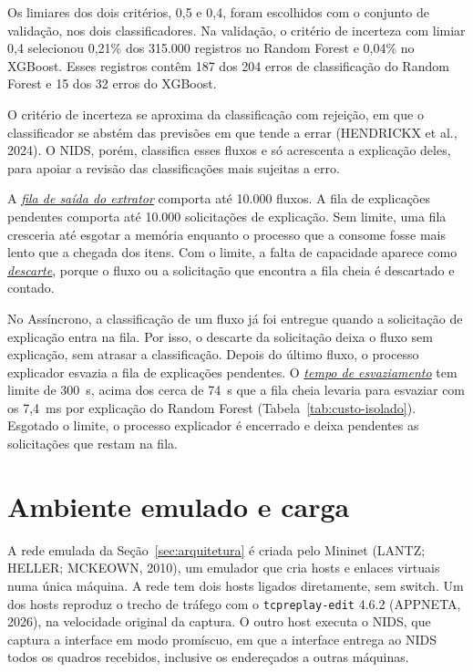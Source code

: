 \documentclass[
  12pt,
  oneside,
  a4paper,
  chapter=TITLE,
  sumario=tradicional,
  english,
  brazil
]{abntex2}
\newcommand{\termo}[2]{\hyperref[gl:#1]{\emph{#2}}}
\begin{document}
Os limiares dos dois critérios, 0,5 e 0,4, foram escolhidos com o conjunto de validação, nos dois
classificadores. Na validação, o critério de incerteza com limiar 0,4 selecionou 0,21\% dos 315.000
registros no Random Forest e 0,04\% no XGBoost. Esses registros contêm 187 dos 204 erros de
classificação do Random Forest e 15 dos 32 erros do XGBoost.

O critério de incerteza se aproxima da classificação com rejeição, em que o classificador se abstém
das previsões em que tende a errar (HENDRICKX et al., 2024). O NIDS, porém, classifica esses fluxos
e só acrescenta a explicação deles, para apoiar a revisão das classificações mais sujeitas a erro.

A \termo{fila-extrator}{fila de saída do extrator} comporta até 10.000 fluxos. A fila de explicações
pendentes comporta até 10.000 solicitações de explicação. Sem limite, uma fila cresceria até
esgotar a memória enquanto o processo que a consome fosse mais lento que a chegada dos itens. Com o
limite, a falta de capacidade aparece como \termo{descarte}{descarte}, porque o fluxo ou a
solicitação que encontra a fila cheia é descartado e contado.

No Assíncrono, a classificação de um fluxo já foi entregue quando a solicitação de explicação entra
na fila. Por isso, o descarte da solicitação deixa o fluxo sem explicação, sem atrasar a
classificação. Depois do último fluxo, o processo explicador esvazia a fila de explicações
pendentes. O \termo{esvaziamento}{tempo de esvaziamento} tem limite de 300~s, acima dos cerca de 74~s que a
fila cheia levaria para esvaziar com os 7,4~ms por explicação do Random Forest
(Tabela~\ref{tab:custo-isolado}). Esgotado o limite, o processo explicador é encerrado e deixa
pendentes as solicitações que restam na fila.

\section{Ambiente emulado e carga}
\label{sec:ambiente}

A rede emulada da Seção~\ref{sec:arquitetura} é criada pelo Mininet (LANTZ; HELLER; MCKEOWN,
2010), um emulador que cria hosts e enlaces virtuais numa única máquina. A rede tem dois hosts
ligados diretamente, sem switch. Um dos hosts reproduz o trecho de tráfego com o
\texttt{tcpreplay-edit} 4.6.2 (APPNETA, 2026), na velocidade original da captura. O outro host
executa o NIDS, que captura a interface em modo promíscuo, em que a interface entrega ao NIDS todos
os quadros recebidos, inclusive os endereçados a outras máquinas.
\end{document}

